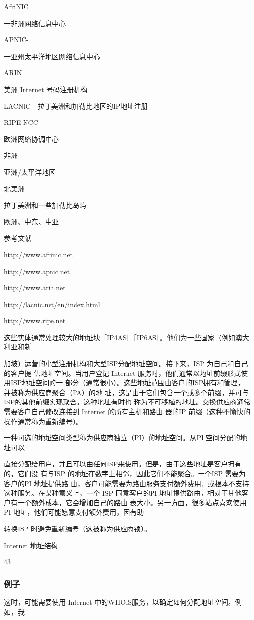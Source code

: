 AfriNIC

一非洲网络信息中心

APNIC-

一亚州太平洋地区网络信息中心

ARIN

美洲 Internet 号码注册机构

LACNIC—拉丁美洲和加勒比地区的IP地址注册

RIPE NCC

欧洲网络协调中心

非洲

亚洲/太平洋地区

北美洲

拉丁美洲和一些加勒比岛屿

欧洲、中东、中亚

参考文献

http://www.afrinic.net

http://www.apnic.net

http://www.arin.net

http://lacnic.net/en/index.html

http://www.ripe.net

这些实体通常处理较大的地址块［IP4AS］［IP6AS］。他们为一些国家（例如澳大利亚和新

加坡）运营的小型注册机构和大型ISP分配地址空间。接下来，ISP 为自己和自己的客户提
供地址空间。当用户登记 Internet 服务时，他们通常以地址前缀形式使用ISP地址空间的一
部分（通常很小）。这些地址范围由客户的ISP拥有和管理，并被称为供应商聚合（PA）的地
址，这是由于它们包含一个或多个前缀，并可与ISP的其他前缀实现聚合。这种地址有时也
称为不可移植的地址。交换供应商通常需要客户自己修改连接到 Internet 的所有主机和路由
器的IP 前缀（这种不愉快的操作通常称为重新编号）。

一种可选的地址空间类型称为供应商独立（PI）的地址空间。从PI 空间分配的地址可以

直接分配给用户，并且可以由任何ISP来使用。但是，由于这些地址是客户拥有的，它们没
有与ISP 的地址在数字上相邻，因此它们不能聚合。一个ISP 需要为客户的PI 地址提供路
由，客户可能需要为路由服务支付额外费用，或根本不支持这种服务。在某种意义上，一个
ISP 同意客户的PI 地址提供路由，相对于其他客户有一个额外成本，它会增加自己的路由
表大小。另一方面，很多站点喜欢使用PI 地址，他们可能愿意支付额外费用，因有助

转换ISP 时避免重新编号（这被称为供应商锁）。

Internet 地址结构

43

\subsubsection{例子}
这时，可能需要使用 Internet 中的WHOIS服务，以确定如何分配地址空间。例如，我

